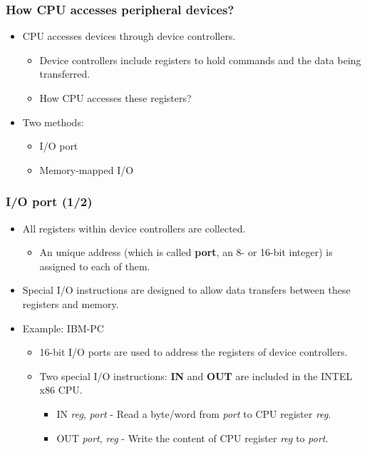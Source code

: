 \documentclass[CJKutf8,xcolor=pdftex,dvipsnames,table]{beamer}
\begin{document}
\begin{CJK*}{UTF8}{song}
  \begin{frame}
    \frametitle{How CPU accesses peripheral devices?} \pause
    \begin{itemize}
    \item{CPU accesses devices through device controllers.} \pause
      \begin{itemize}
      \item{Device controllers include registers to hold commands and the data being transferred.} \pause
      \item{How CPU accesses these registers?} \pause
      \end{itemize}
    \item{Two methods:} \pause
      \begin{itemize}
      \item{I/O port} \pause
      \item{Memory-mapped I/O}
      \end{itemize}
    \end{itemize}
  \end{frame}

  \begin{frame}
    \frametitle{I/O port (1/2)} \pause
    \begin{itemize}
    \item{All registers within device controllers are collected.} \pause
      \begin{itemize}
      \item{An unique address (which is called \textbf{port}, an 8- or 16-bit integer) is assigned to each of them.} \pause
      \end{itemize}
    \item{Special I/O instructions are designed to allow data transfers between these registers and memory.} \pause
    \item{Example: IBM-PC} \pause
      \begin{itemize}
      \item{16-bit I/O ports are used to address the registers of device controllers.} \pause
      \item{Two special I/O instructions: \textbf{IN} and \textbf{OUT} are included in the INTEL x86 CPU.} \pause
        \begin{itemize}
        \item{IN \emph{reg}, \emph{port} - Read a byte/word from \emph{port} to CPU register \emph{reg}.} \pause
        \item{OUT \emph{port}, \emph{reg} - Write the content of CPU register \emph{reg} to \emph{port}.}
        \end{itemize}
      \end{itemize}
    \end{itemize}
  \end{frame}


\end{CJK*}
\end{document}
